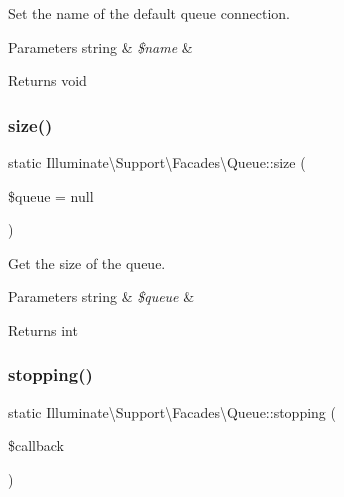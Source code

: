 Set the name of the default queue connection.


\begin{DoxyParams}[1]{Parameters}
string & {\em \$name} & \\
\hline
\end{DoxyParams}
\begin{DoxyReturn}{Returns}
void 
\end{DoxyReturn}
\mbox{\label{class_illuminate_1_1_support_1_1_facades_1_1_queue_a0a67d96dfa53c28ed1f46e5bc9b99133}} 
\subsubsection{\texorpdfstring{size()}{size()}}
{\footnotesize\ttfamily static Illuminate\textbackslash{}\+Support\textbackslash{}\+Facades\textbackslash{}\+Queue\+::size (\begin{DoxyParamCaption}\item[{}]{\$queue = {\ttfamily null} }\end{DoxyParamCaption})\hspace{0.3cm}{\ttfamily [static]}}

Get the size of the queue.


\begin{DoxyParams}[1]{Parameters}
string & {\em \$queue} & \\
\hline
\end{DoxyParams}
\begin{DoxyReturn}{Returns}
int 
\end{DoxyReturn}
\mbox{\label{class_illuminate_1_1_support_1_1_facades_1_1_queue_af1dce728ca2ce292a6034d11bbd067a9}} 
\subsubsection{\texorpdfstring{stopping()}{stopping()}}
{\footnotesize\ttfamily static Illuminate\textbackslash{}\+Support\textbackslash{}\+Facades\textbackslash{}\+Queue\+::stopping (\begin{DoxyParamCaption}\item[{}]{\$callback }\end{DoxyParamCaption})\hspace{0.3cm}{\ttfamily [static]}}

